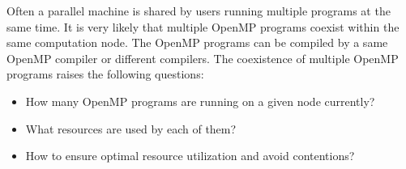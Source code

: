 Often a parallel machine is shared by users running multiple programs at the same time.
It is very likely that multiple OpenMP programs coexist within the same computation node. 
The OpenMP programs can be compiled by a same OpenMP compiler or different compilers. 
The coexistence of multiple OpenMP programs raises the following questions:
\begin{itemize}
\item How many OpenMP programs are running on a given node currently?
\item What resources are used by each of them?
\item How to ensure optimal resource utilization and avoid contentions?
\end{itemize}

